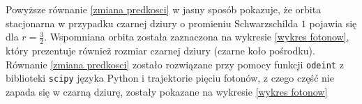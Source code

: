 Powyższe równanie \ref{zmiana predkosci} w jasny sposób pokazuje, że orbita stacjonarna w przypadku czarnej dziury o promieniu Schwarzschilda $1$ pojawia się dla $r=\frac{3}{2}$. Wspomniana orbita została zaznaczona na wykresie \ref{wykres fotonow}, który prezentuje również rozmiar czarnej dziury (czarne koło pośrodku). Równanie \ref{zmiana predkosci} zostało rozwiązane przy pomocy funkcji \verb+odeint+ z biblioteki \verb+scipy+ języka Python i trajektorie pięciu fotonów, z czego część nie zapada się w czarną dziurę, zostały pokazane na wykresie \ref{wykres fotonow}





%
%
%
%

